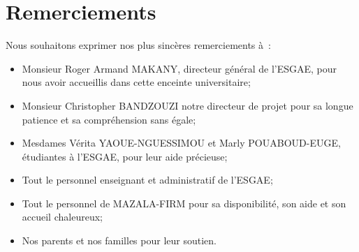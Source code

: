 \chapter*{Remerciements}

Nous souhaitons exprimer nos plus sincères remerciements à :

\begin{itemize}
  \item Monsieur Roger Armand MAKANY, directeur général de l’ESGAE,
      pour nous avoir accueillis dans cette enceinte universitaire;

  \item Monsieur Christopher BANDZOUZI notre directeur de projet pour sa
      longue patience et sa compréhension sans égale;

  \item Mesdames Vérita YAOUE-NGUESSIMOU et Marly POUABOUD-EUGE, étudiantes à l’ESGAE, pour
      leur aide précieuse;

  \item Tout le personnel enseignant et administratif de l’ESGAE;


  \item Tout le personnel de MAZALA-FIRM pour sa disponibilité, son aide et son
      accueil chaleureux;

  \item Nos parents et nos familles pour leur soutien.

\end{itemize}
